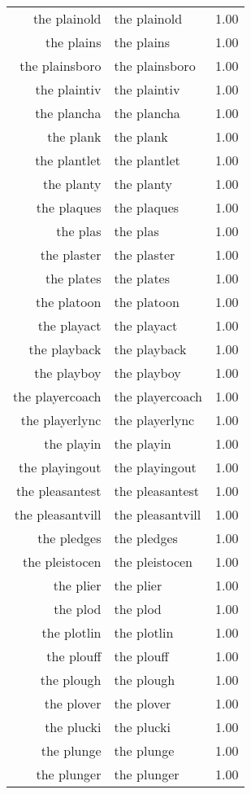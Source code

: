\begin{table}[ht]
\begin{tabular}{rlr}
  the plainold & the plainold & 1.00 \\ 
  the plains & the plains & 1.00 \\ 
  the plainsboro & the plainsboro & 1.00 \\ 
  the plaintiv & the plaintiv & 1.00 \\ 
  the plancha & the plancha & 1.00 \\ 
  the plank & the plank & 1.00 \\ 
  the plantlet & the plantlet & 1.00 \\ 
  the planty & the planty & 1.00 \\ 
  the plaques & the plaques & 1.00 \\ 
  the plas & the plas & 1.00 \\ 
  the plaster & the plaster & 1.00 \\ 
  the plates & the plates & 1.00 \\ 
  the platoon & the platoon & 1.00 \\ 
  the playact & the playact & 1.00 \\ 
  the playback & the playback & 1.00 \\ 
  the playboy & the playboy & 1.00 \\ 
  the playercoach & the playercoach & 1.00 \\ 
  the playerlync & the playerlync & 1.00 \\ 
  the playin & the playin & 1.00 \\ 
  the playingout & the playingout & 1.00 \\ 
  the pleasantest & the pleasantest & 1.00 \\ 
  the pleasantvill & the pleasantvill & 1.00 \\ 
  the pledges & the pledges & 1.00 \\ 
  the pleistocen & the pleistocen & 1.00 \\ 
  the plier & the plier & 1.00 \\ 
  the plod & the plod & 1.00 \\ 
  the plotlin & the plotlin & 1.00 \\ 
  the plouff & the plouff & 1.00 \\ 
  the plough & the plough & 1.00 \\ 
  the plover & the plover & 1.00 \\ 
  the plucki & the plucki & 1.00 \\ 
  the plunge & the plunge & 1.00 \\ 
  the plunger & the plunger & 1.00 \\ 

\end{tabular}
\end{table}
